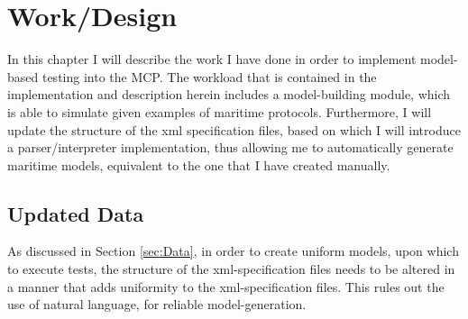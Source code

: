 \chapter{Work/Design}

In this chapter I will describe the work I have done in order to implement model-based testing into the MCP. The workload that is contained in the implementation and description herein includes a model-building module, which is able to simulate given examples of maritime protocols. Furthermore, I will update the structure of the xml specification files, based on which I will introduce a parser/interpreter implementation, thus allowing me to automatically generate maritime models, equivalent to the one that I have created manually.

\section{Updated Data}

As discussed in Section \ref{sec:Data}, in order to create uniform models, upon which to execute tests, the structure of the xml-specification files needs to be altered in a manner that adds uniformity to the xml-specification files. This rules out the use of natural language, for reliable model-generation.

